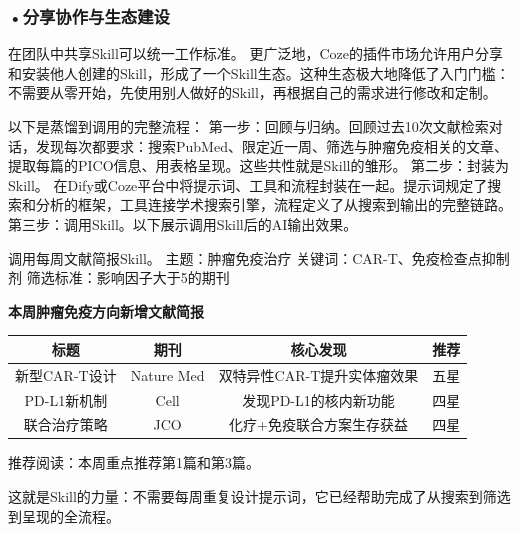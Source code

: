\subsubsection*{\textbf{•分享协作与生态建设}}
在团队中共享Skill可以统一工作标准。
更广泛地，Coze的插件市场允许用户分享和安装他人创建的Skill，形成了一个Skill生态。这种生态极大地降低了入门门槛：不需要从零开始，先使用别人做好的Skill，再根据自己的需求进行修改和定制。

以下是蒸馏到调用的完整流程：
第一步：回顾与归纳。回顾过去10次文献检索对话，发现每次都要求：搜索PubMed、限定近一周、筛选与肿瘤免疫相关的文章、提取每篇的PICO信息、用表格呈现。这些共性就是Skill的雏形。
第二步：封装为Skill。
在Dify或Coze平台中将提示词、工具和流程封装在一起。提示词规定了搜索和分析的框架，工具连接学术搜索引擎，流程定义了从搜索到输出的完整链路。
第三步：调用Skill。以下展示调用Skill后的AI输出效果。

\begin{userbox}
调用每周文献简报Skill。
主题：肿瘤免疫治疗
关键词：CAR-T、免疫检查点抑制剂
筛选标准：影响因子大于5的期刊
\end{userbox}

\begin{aibox}
\textbf{本周肿瘤免疫方向新增文献简报}

\begin{formalTable}[H]
\caption{本周新增文献简报}
\label{tab:ch3_05_literature}
\begin{tabular}{c c c c}
\toprule
标题 & 期刊 & 核心发现 & 推荐 \\ \midrule
新型CAR-T设计 & Nature Med & 双特异性CAR-T提升实体瘤效果 & 五星 \\
PD-L1新机制 & Cell & 发现PD-L1的核内新功能 & 四星 \\
联合治疗策略 & JCO & 化疗+免疫联合方案生存获益 & 四星 \\ \bottomrule
\end{tabular}
\end{formalTable}

推荐阅读：本周重点推荐第1篇和第3篇。
\end{aibox}

这就是Skill的力量：不需要每周重复设计提示词，它已经帮助完成了从搜索到筛选到呈现的全流程。

\begin{center}
\textcolor{gray!70}{\*\ \ \*\ \ \*}
\end{center}
\vspace{12pt}




